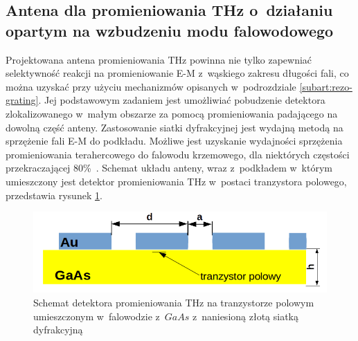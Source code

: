 \subsection{Antena dla promieniowania THz o~działaniu opartym na wzbudzeniu modu falowodowego}
\label{subart:antenaThz}
Projektowana antena promieniowania THz powinna nie tylko zapewniać selektywność reakcji na promieniowanie E-M z~wąskiego zakresu długości fali, co można uzyskać przy użyciu mechanizmów opisanych w~podrozdziale \ref{subart:rezo-grating}. Jej podstawowym zadaniem jest umożliwiać pobudzenie detektora zlokalizowanego w~małym obszarze za pomocą promieniowania padającego na dowolną część anteny. Zastosowanie siatki dyfrakcyjnej jest wydajną metodą na sprzężenie fali E-M do podkładu. Możliwe jest uzyskanie wydajności sprzężenia promieniowania terahercowego do falowodu krzemowego, dla niektórych częstości przekraczającej 80\%~\cite{roux2002grating}.  Schemat układu anteny, wraz z~podkładem w~którym umieszczony jest detektor promieniowania THz w~postaci tranzystora polowego, przedstawia rysunek \ref{fig:schem-podklad-falo}.
\begin{figure}[tb]
	\centering
	\includegraphics[width=\textwidth]{images/thz/schemat-podklad-falo.png}
	\caption{Schemat detektora promieniowania THz na tranzystorze polowym umieszczonym w~falowodzie z~$GaAs$ z~naniesioną złotą siatką dyfrakcyjną}
	\label{fig:schem-podklad-falo}
\end{figure}

